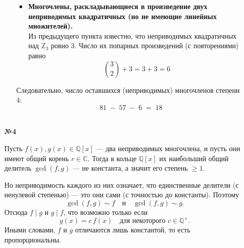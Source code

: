 \documentclass[a4paper]{article}
\newcommand{\CC}{\mathbb{C}}
\newcommand{\QQ}{\mathbb{Q}}
\newcommand{\ZZ}{\mathbb{Z}}
\begin{document}
\begin{enumerate}
\begin{enumerate}
\begin{itemize}
      \item \textbf{Многочлены, раскладывающиеся в произведение двух неприводимых квадратичных (но не имеющие линейных множителей).}\\
        Из предыдущего пункта известно, что неприводимых квадратичных над \(\ZZ_3\) ровно 3.  
        Число их попарных произведений (с повторениями) равно
        \[
          \binom{3}{2} + 3 = 3 + 3 = 6
        \]
    \end{itemize}
      
    Следовательно, число оставшихся (неприводимых) многочленов степени 4:
    \[
      81 \;-\; 57 \;-\; 6 \;=\; 18
    \]\\
  \end{enumerate}
  
  \item[\textbf{№4}]
  
  Пусть \(f(x),g(x)\in \QQ [x]\) --- два неприводимых многочлена, и пусть они имеют общий корень \(r \in \CC\). Тогда в кольце \(\QQ[x]\) их наибольший общий делитель \(\gcd(f,g)\) --- не константа, а значит его степень \(\ge 1\).

  Но неприводимость каждого из них означает, что единственные делители (с ненулевой степенью) --- это они сами (с точностью до константы). Поэтому
  \[
  \gcd(f,g) \sim  f
  \quad\text{и}\quad
  \gcd(f,g) \sim  g.
  \]
  Отсюда \(f\mid g\) и \(g\mid f\), что возможно только если
  \[
  g(x)=c\,f(x)
  \quad\text{для некоторого }c\in \QQ^\times.
  \]
  Иными словами, \(f\) и \(g\) отличаются лишь константой, то есть пропорциональны.
  
\end{enumerate}
\end{document}
